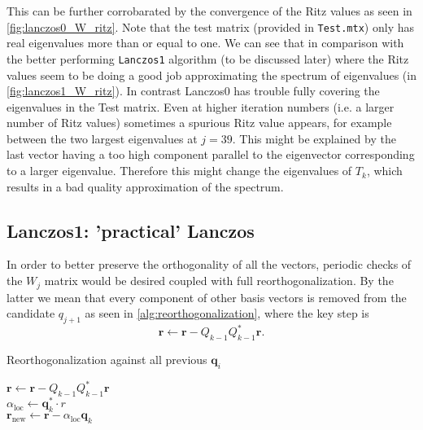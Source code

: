 \documentclass{article}
\begin{document}
	This can be further corrobarated by the convergence of the Ritz values as seen in \autoref{fig:lanczos0_W_ritz}.
	Note that the test matrix (provided in \texttt{Test.mtx}) only has real eigenvalues more than or equal to one. We can see that in 
	comparison with the better performing \texttt{Lanczos1} algorithm (to be discussed later) where the Ritz values seem to be doing a good job approximating the spectrum of eigenvalues (in \autoref{fig:lanczos1_W_ritz}). In contrast Lanczos0 has trouble fully covering the eigenvalues in the Test matrix. Even at higher iteration numbers (i.e. a larger number of Ritz values) sometimes a spurious Ritz value appears, for example between the two largest eigenvalues at $j=39$. This might be explained by the last vector having a too high component parallel to the eigenvector corresponding to a larger eigenvalue. Therefore this might change the eigenvalues of $T_k$, which results in a bad quality approximation of the spectrum.
	
	
	
	\subsection{Lanczos1: 'practical' Lanczos}
	In order to better preserve the orthogonality of all the vectors, periodic checks of the $W_j$ matrix would be desired coupled with full reorthogonalization. By the latter we mean that every component of other basis vectors is removed from the candidate $q_{j+1}$ as seen in \autoref{alg:reorthogonalization}, where the key step is
	\begin{equation}
		\textbf{r} \gets \textbf{r} - Q_{k-1} Q_{k-1}^\ast \textbf{r}.
	\end{equation}
	\begin{algorithm2e}[h!]
	\caption{Reorthogonalization against all previous $\textbf{q}_i$}\label{alg:reorthogonalization}
	
	$\textbf{r} \gets \textbf{r} - Q_{k-1} Q_{k-1}^\ast \textbf{r}$\\
	$\alpha_{\text{loc}} \gets \textbf{q}_k^\ast \cdot r$\\
	$\textbf{r}_{\text{new}} \gets \textbf{r} - \alpha_{\text{loc}}  \textbf{q}_k$\\
\end{algorithm2e}
	
\end{document}

